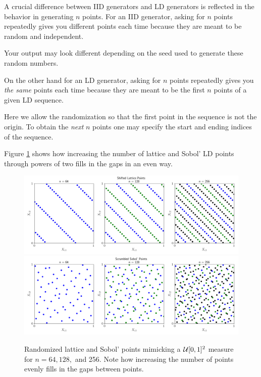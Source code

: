 \documentclass[graybox,footinfo]{svmult}
\begin{document}
A crucial difference between IID generators and LD generators is reflected in the behavior in generating $n$ points.  For an IID generator, asking for $n$ points repeatedly gives you different points each time because they are meant to be random and independent.

Your output may look different depending on the seed used to generate these random numbers.

On the other hand for an LD generator, asking for $n$ points repeatedly gives you \emph{the same} points each time because they are meant to be the first $n$ points of a given LD sequence.  

Here we allow the randomization so that the first point in the sequence is not the origin.  To obtain the \emph{next} $n$ points one may specify the start and ending indices of the sequence.


Figure \ref{fig:increase_n} shows how increasing the number of lattice and Sobol' LD points through powers of two fills in the gaps in an even way.

\begin{figure}
	\includegraphics[width=1\textwidth]{QMCSoftwareArticle/figs/dd_lattice_successive.png}
	\qquad
	\includegraphics[width=1\textwidth]{QMCSoftwareArticle/figs/dd_sobol_successive.png}
	\caption{Randomized lattice and Sobol' points mimicking a ${\mathcal{U}}[0,1]^2$ measure for $n = 64, 128,$ and 256. Note how increasing the number of points evenly fills in the gaps between points.}
	\label{fig:increase_n}
\end{figure}
\end{document}
